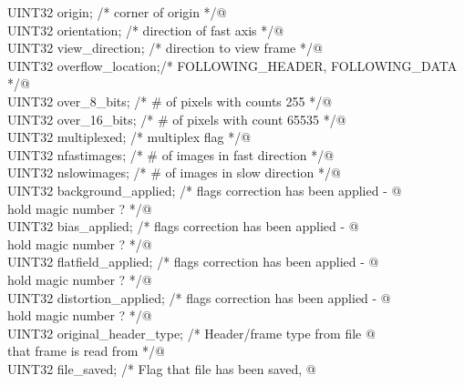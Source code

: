 \documentclass[10pt,a4paper,twoside,notitlepage]{article}
\begin{document}
\begin{flushleft}
\begin{minipage}{\linewidth}
\begin{list}{}{}
\mbox{}\verb@         UINT32        origin;           /* corner of origin             */@\\
\mbox{}\verb@         UINT32        orientation;      /* direction of fast axis       */@\\
\mbox{}\verb@         UINT32        view_direction;   /* direction to view frame      */@\\
\mbox{}\verb@         UINT32        overflow_location;/* FOLLOWING_HEADER,  FOLLOWING_DATA */@\\
\mbox{}\verb@         UINT32        over_8_bits;      /* # of pixels with counts  255 */@\\
\mbox{}\verb@         UINT32        over_16_bits;     /* # of pixels with count  65535 */@\\
\mbox{}\verb@         UINT32        multiplexed;      /* multiplex flag */@\\
\mbox{}\verb@         UINT32        nfastimages;      /* # of images in fast direction */@\\
\mbox{}\verb@         UINT32        nslowimages;      /* # of images in slow direction */@\\
\mbox{}\verb@         UINT32        background_applied; /* flags correction has been applied - @\\
\mbox{}\verb@                                              hold magic number ? */@\\
\mbox{}\verb@         UINT32        bias_applied;       /* flags correction has been applied - @\\
\mbox{}\verb@                                              hold magic number ? */@\\
\mbox{}\verb@         UINT32        flatfield_applied;  /* flags correction has been applied - @\\
\mbox{}\verb@                                              hold magic number ? */@\\
\mbox{}\verb@         UINT32        distortion_applied; /* flags correction has been applied - @\\
\mbox{}\verb@                                              hold magic number ? */@\\
\mbox{}\verb@         UINT32        original_header_type;     /* Header/frame type from  file @\\
\mbox{}\verb@                                                    that frame is read from */@\\
\mbox{}\verb@         UINT32        file_saved;         /* Flag that file has been  saved, @\\

\end{list}
\end{minipage}
\end{flushleft}
\end{document}
